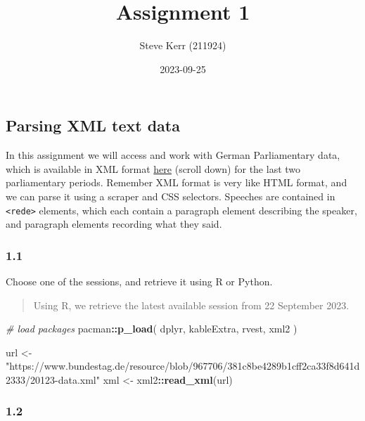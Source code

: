 \documentclass[
]{article}
\title{Assignment 1}
\author{Steve Kerr (211924)}
\date{2023-09-25}
\newenvironment{Shaded}{\begin{snugshade}}{\end{snugshade}}
\newcommand{\CommentTok}[1]{\textcolor[rgb]{0.56,0.35,0.01}{\textit{#1}}}
\newcommand{\FunctionTok}[1]{\textcolor[rgb]{0.13,0.29,0.53}{\textbf{#1}}}
\newcommand{\NormalTok}[1]{#1}
\newcommand{\OtherTok}[1]{\textcolor[rgb]{0.56,0.35,0.01}{#1}}
\newcommand{\SpecialCharTok}[1]{\textcolor[rgb]{0.81,0.36,0.00}{\textbf{#1}}}
\newcommand{\StringTok}[1]{\textcolor[rgb]{0.31,0.60,0.02}{#1}}
\begin{document}
\maketitle

\hypertarget{parsing-xml-text-data}{%
\subsection{Parsing XML text data}\label{parsing-xml-text-data}}

In this assignment we will access and work with German Parliamentary
data, which is available in XML format
\href{https://www.bundestag.de/services/opendata}{here} (scroll down)
for the last two parliamentary periods. Remember XML format is very like
HTML format, and we can parse it using a scraper and CSS selectors.
Speeches are contained in \texttt{\textless{}rede\textgreater{}}
elements, which each contain a paragraph element describing the speaker,
and paragraph elements recording what they said.

\hypertarget{section}{%
\subsubsection{1.1}\label{section}}

Choose one of the sessions, and retrieve it using R or Python.

\begin{quote}
Using R, we retrieve the latest available session from 22 September
2023.
\end{quote}

\begin{Shaded}
\begin{Highlighting}[]
\CommentTok{\# load packages}
\NormalTok{pacman}\SpecialCharTok{::}\FunctionTok{p\_load}\NormalTok{(}
\NormalTok{  dplyr,}
\NormalTok{  kableExtra,}
\NormalTok{  rvest,}
\NormalTok{  xml2}
\NormalTok{)}

\NormalTok{url }\OtherTok{\textless{}{-}} \StringTok{"https://www.bundestag.de/resource/blob/967706/381c8be4289b1cff2ca33f8d641d2333/20123{-}data.xml"}
\NormalTok{xml }\OtherTok{\textless{}{-}}\NormalTok{ xml2}\SpecialCharTok{::}\FunctionTok{read\_xml}\NormalTok{(url)}
\end{Highlighting}
\end{Shaded}

\hypertarget{section-1}{%
\subsubsection{1.2}\label{section-1}}
\end{document}
